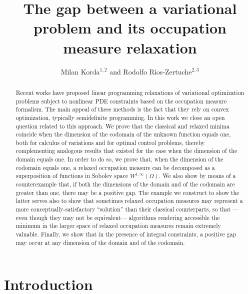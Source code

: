 \documentclass{article}
\title{The gap between a variational problem and its occupation measure relaxation}
\author{Milan Korda$^{1,2}$ and Rodolfo R\'ios-Zertuche$^{2,3}$}
\date{}
\theoremstyle{definition}
\theoremstyle{remark}
\begin{document}
\maketitle



\renewcommand{\thefootnote}{\fnsymbol{footnote}} 
\renewcommand{\thefootnote}{\arabic{footnote}} 


\begin{abstract}
 Recent works have proposed linear programming relaxations of variational optimization problems subject to nonlinear PDE constraints based on the occupation measure formalism. The main appeal of these methods is the fact that they rely on convex optimization, typically semidefinite programming. In this work we close an open question related to this approach. We prove that the classical and relaxed minima coincide when the dimension of the codomain of the unknown function equals one, both for calculus of variations and for optimal control problems, thereby complementing analogous results that existed for the case when the dimension of the domain equals one. In order to do so, we prove that, when the dimension of the codomain equals one, a relaxed occupation measure can be decomposed as a superposition of functions in Sobolev space $W^{1,\infty}(\Omega)$. 
 We also show by means of a counterexample that, if both the dimensions of the domain and of the codomain are greater than one, there may be a positive gap. The example we construct to show the latter serves also to show that sometimes relaxed occupation measures may represent a more conceptually-satisfactory ``solution'' than their classical counterparts, so that ---even though they may not be equivalent--- algorithms rendering accessible the minimum in the larger space of relaxed occupation measures remain extremely valuable. Finally, we show that in the presence of integral constraints, a positive gap may occur at any dimension of the domain and of the codomain.
\end{abstract}


\tableofcontents

\section{Introduction}
\label{sec:intro}
%
%
%
%
%
%
%
%
%
%
%
%
%
\end{document}

